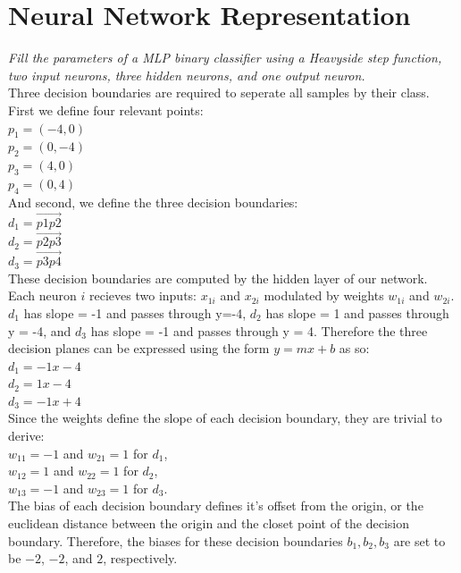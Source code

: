 \documentclass{amsart}
\theoremstyle{definition}
\theoremstyle{remark}
\numberwithin{equation}{section}
\begin{document}
\section{Neural Network Representation}

\textit{Fill the parameters of a MLP binary classifier using a Heavyside step
function, two input neurons, three hidden neurons, and one output neuron.} \\

Three decision boundaries are required to seperate all samples by their class.
First we define four relevant points: \\

$p_1 = (-4, 0)$ \\
$p_2 = (0, -4)$ \\
$p_3 = (4, 0)$ \\
$p_4 = (0, 4)$ \\

And second, we define the three decision boundaries: \\

$d_1 = \overrightarrow{p1p2}$ \\ %
$d_2 = \overrightarrow{p2p3}$ \\ %
$d_3 = \overrightarrow{p3p4}$ \\ %

These decision boundaries are computed by the hidden layer of our network. Each
neuron $i$ recieves two inputs: $x_{1i}$ and $x_{2i}$ modulated by weights
$w_{1i}$ and $w_{2i}$. $d_1$ has slope = -1 and passes through y=-4,
$d_2$ has slope = 1 and passes through y = -4, and $d_3$ has
slope = -1 and passes through y = 4. Therefore the three decision planes can be
expressed using the form $y = mx + b$ as so: \\

$d_1 = -1x - 4$ \\
$d_2 = 1x - 4$ \\
$d_3 = -1x + 4$ \\

Since the weights define the slope of each decision boundary, they are trivial
to derive: \\

$w_{11} = -1$ and $w_{21} = 1$ for $d_1$, \\
$w_{12} = 1$ and $w_{22} = 1$ for $d_2$, \\
$w_{13} = -1$ and $w_{23} = 1$ for $d_3$. \\

The bias of each decision boundary defines it's offset from the origin, or the
euclidean distance between the origin and the closet point of the decision
boundary. Therefore, the biases for these decision boundaries ${b_1, b_2, b_3}$
are set to be $-2$, $-2$, and $2$, respectively.\\
\end{document}
